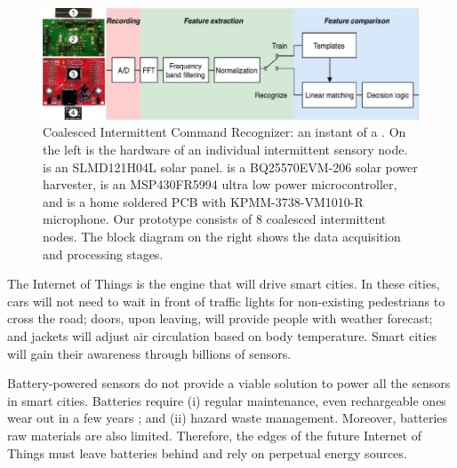 \begin{figure}
	\centering
		\includegraphics[width=\columnwidth]{figures/cis}
		\caption{Coalesced Intermittent Command Recognizer: an instant of a \fullsys. On the left is the hardware of an individual intermittent sensory node.  is an SLMD121H04L solar panel.  is a BQ25570EVM-206 solar power harvester,  is an MSP430FR5994 ultra low power microcontroller, and  is a home soldered PCB with KPMM-3738-VM1010-R microphone. Our prototype consists of 8 coalesced intermittent nodes. The block diagram on the right shows the data acquisition and processing stages.}
		\label{fig:powerCycle}
\end{figure}

The Internet of Things is the engine that will drive smart cities. In these cities, cars will not need to wait in front of traffic lights for non-existing pedestrians to cross the road; doors, upon leaving, will provide people with weather forecast; and jackets will adjust air circulation based on body temperature. Smart cities will gain their awareness through billions of sensors.

Battery-powered sensors do not provide a viable solution to power all the sensors in smart cities. Batteries require (i) regular maintenance, even rechargeable ones wear out in a few years \cite{xxx}; and (ii) hazard waste management. Moreover, batteries raw materials are also limited. Therefore, the edges of the future Internet of Things must leave batteries behind and rely on perpetual energy sources. 

